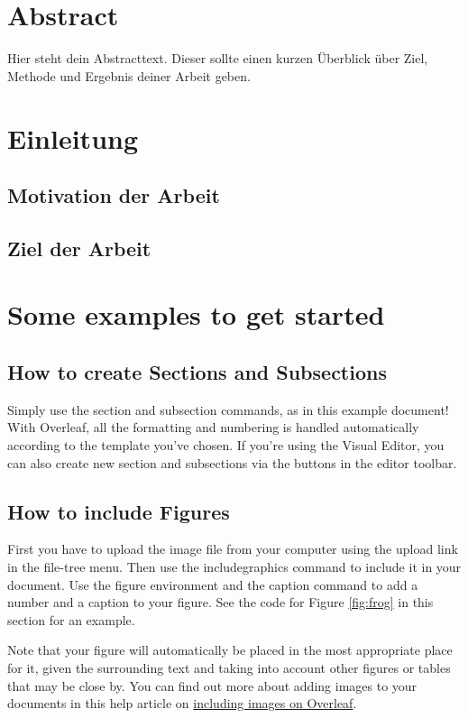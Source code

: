 \documentclass[a4paper,12pt]{scrreprt}
\begin{document}
\cleardoublepage
\chapter*{Abstract}
\thispagestyle{plain}
Hier steht dein Abstracttext. Dieser sollte einen kurzen Überblick über Ziel, Methode und Ergebnis deiner Arbeit geben.

\clearpage
\chapter{Einleitung}

\section{Motivation der Arbeit}
\section{Ziel der Arbeit}


\chapter{Some examples to get started}
\section{How to create Sections and Subsections}

Simply use the section and subsection commands, as in this example document! With Overleaf, all the formatting and numbering is handled automatically according to the template you've chosen. If you're using the Visual Editor, you can also create new section and subsections via the buttons in the editor toolbar.

\section{How to include Figures}

First you have to upload the image file from your computer using the upload link in the file-tree menu. Then use the includegraphics command to include it in your document. Use the figure environment and the caption command to add a number and a caption to your figure. See the code for Figure \ref{fig:frog} in this section for an example.

Note that your figure will automatically be placed in the most appropriate place for it, given the surrounding text and taking into account other figures or tables that may be close by. You can find out more about adding images to your documents in this help article on \href{https://www.overleaf.com/learn/how-to/Including_images_on_Overleaf}{including images on Overleaf}.
\end{document}
